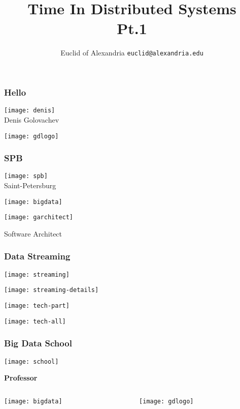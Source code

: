 \documentclass[aspectratio=169, 15pt,usenames,dvipsnames]{beamer}
\title{Time In Distributed Systems\\Pt.1}
\author[Euclid]{Euclid of Alexandria \texttt{euclid@alexandria.edu}}
\begin{document}
   
	\begin{titlePage} 
		\titlepage        
	\end{titlePage}
		
	\begin{gdblank}
		\frametitle{Hello}
		\centering\texttt{[image: denis]}
		\\Denis Golovachev		
	\end{gdblank} 
	\begin{gdblank}
		\centering\texttt{[image: gdlogo]}
	\end{gdblank}
	\begin{gdblank}
		\frametitle{SPB}
		\centering\texttt{[image: spb]}
		\\Saint-Petersburg
	\end{gdblank}
	\begin{gdblank}
		\centering\texttt{[image: bigdata]} 
	\end{gdblank}
	\begin{gdblank}
		\centering\texttt{[image: garchitect]} 
		\par\LARGE
		Software Architect
	\end{gdblank}
	\begin{gdblank}
		\frametitle{Data Streaming}
		\centering\texttt{[image: streaming]} 
	\end{gdblank}
	\begin{gdblank}
		\centering\texttt{[image: streaming-details]} 
	\end{gdblank}
	\begin{gdblank}
		\centering\texttt{[image: tech-part]} 
	\end{gdblank}
	\begin{gdblank}
		\centering\texttt{[image: tech-all]} 
	\end{gdblank}
	\begin{gdblank}
		\frametitle{Big Data School}
		\centering\texttt{[image: school]}
		\par\LARGE
		\pause
		\textbf{
			Professor
		}		
	\end{gdblank}
	\begin{gdblank}
		\centering{\fontsize{100pt}{120pt}\selectfont\bf Boring}
	\end{gdblank}   
	\begin{gdblank}
		\begin{columns}
			\begin{column}{0.5\textwidth}
				\centering\texttt{[image: bigdata]}
			\end{column}
			\pause 
			\begin{column}{0.5\textwidth}
				\centering\texttt{[image: gdlogo]}
			\end{column}
		\end{columns}        
	\end{gdblank}
\end{document}
